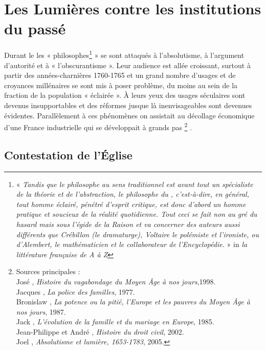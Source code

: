 

\chapter{Les Lumières contre les institutions du passé}


 Durant le  les « philosophes\footnote{« \emph{Tandis que le philosophe au sens traditionnel est avant tout un spécialiste de la théorie et de l'abstraction, le philosophe du , c'est-à-dire, en général, tout homme éclairé, pénétré d'esprit critique, est donc d'abord un homme pratique et soucieux de la réalité quotidienne. Tout ceci se fait non au gré du hasard mais sous l'égide de la Raison et va concerner des auteurs aussi différents que Crébillon (le dramaturge), Voltaire le polémiste et l'ironiste, ou d'Alembert, le mathématicien et le collaborateur de l'Encyclopédie.} » in \emph{la littérature française de A à Z}} » se sont attaqués à l'absolutisme, à l'argument d'autorité et à « l'obscurantisme ». Leur audience est allée croissant, surtout à partir des années-charnières 1760-1765 et un grand nombre d'usages et de croyances millénaires se sont mis à poser problème, du moins au sein de la fraction de la population « éclairée ». À leurs yeux des usages séculaires sont devenus insupportables et des réformes jusque là inenvisageables sont devenues évidentes. Parallèlement à ces phénomènes on assistait au décollage économique d'une France industrielle qui se développait à grands pas%
\footnote{Sources principales :
\\José , \emph{Histoire du vagabondage du Moyen Âge à nos jours},1998.
\\Jacques {}, \emph{La police des familles}, 1977.
\\Bronislaw {}, \emph{La potence ou la pitié, l'Europe et les pauvres du Moyen Âge à nos jours}, 1987.
\\Jack {}, \emph{L'évolution de la famille et du mariage en Europe}, 1985.
\\Jean-Philippe  et André , \emph{Histoire du droit civil}, 2002.
\\Joel {}, \emph{Absolutisme et lumière, 1653-1783}, 2005. }%
.

 
\section{Contestation de l'Église}

